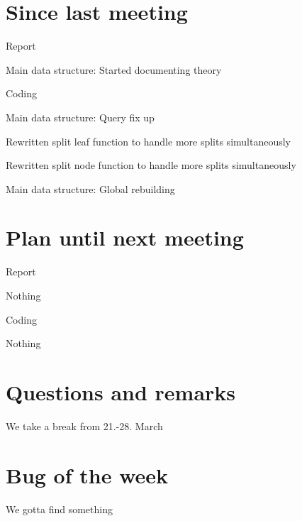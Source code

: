 \documentclass[a4paper,11pt,agenda,chair]{meetingmins}
\begin{document}
\maketitle

\section{Since last meeting}
\begin{items}
\item Report
	\begin{items}
		\item Main data structure: Started documenting theory
	\end{items}
\item Coding
	\begin{items}
		\item Main data structure: Query fix up
			\begin{items}
				\item Rewritten split leaf function to handle more splits simultaneously
				\item Rewritten split node function to handle more splits simultaneously
			\end{items}
		\item Main data structure: Global rebuilding
		
	\end{items}
\end{items}

\section{Plan until next meeting}
\begin{items}
\item Report
	\begin{items}
		\item Nothing
	\end{items}
\item Coding
	\begin{items}
		\item Nothing
	\end{items}
\end{items}

\section{Questions and remarks}
\begin{items}
	\item We take a break from 21.-28. March
\end{items}

\section{Bug of the week}
We gotta find something
\end{document}
